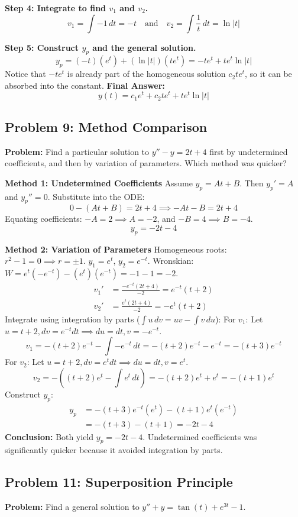 \documentclass{article}
\begin{document}
\textbf{Step 4: Integrate to find $v_1$ and $v_2$.}
\[ v_1 = \int -1 \, dt = -t \quad \text{and} \quad v_2 = \int \frac{1}{t} \, dt = \ln|t| \]

\textbf{Step 5: Construct $y_p$ and the general solution.}
\[ y_p = (-t)(e^t) + (\ln|t|)(t e^t) = -t e^t + t e^t \ln|t| \]
Notice that $-t e^t$ is already part of the homogeneous solution $c_2 t e^t$, so it can be absorbed into the constant.
\textbf{Final Answer:}
\[ y(t) = c_1 e^t + c_2 t e^t + t e^t \ln|t| \]

\subsection{Problem 9: Method Comparison}
\textbf{Problem:} Find a particular solution to $y'' - y = 2t + 4$ first by undetermined coefficients, and then by variation of parameters. Which method was quicker?

\textbf{Method 1: Undetermined Coefficients}
Assume $y_p = At + B$. Then $y_p' = A$ and $y_p'' = 0$.
Substitute into the ODE:
\[ 0 - (At + B) = 2t + 4 \implies -At - B = 2t + 4 \]
Equating coefficients: $-A = 2 \implies A = -2$, and $-B = 4 \implies B = -4$.
\[ y_p = -2t - 4 \]

\textbf{Method 2: Variation of Parameters}
Homogeneous roots: $r^2 - 1 = 0 \implies r = \pm 1$. $y_1 = e^t$, $y_2 = e^{-t}$.
Wronskian: $W = e^t(-e^{-t}) - (e^t)(e^{-t}) = -1 - 1 = -2$.
\begin{align*}
v_1' &= \frac{-e^{-t}(2t+4)}{-2} = e^{-t}(t+2) \\
v_2' &= \frac{e^t(2t+4)}{-2} = -e^t(t+2)
\end{align*}
Integrate using integration by parts ($\int u \, dv = uv - \int v \, du$):
For $v_1$: Let $u = t+2, dv = e^{-t}dt \implies du = dt, v = -e^{-t}$.
\[ v_1 = -(t+2)e^{-t} - \int -e^{-t} \, dt = -(t+2)e^{-t} - e^{-t} = -(t+3)e^{-t} \]
For $v_2$: Let $u = t+2, dv = e^tdt \implies du = dt, v = e^t$.
\[ v_2 = -\left( (t+2)e^t - \int e^t \, dt \right) = -(t+2)e^t + e^t = -(t+1)e^t \]
Construct $y_p$:
\begin{align*}
y_p &= -(t+3)e^{-t}(e^t) - (t+1)e^t(e^{-t}) \\
&= -(t+3) - (t+1) = -2t - 4
\end{align*}
\textbf{Conclusion:} Both yield $y_p = -2t - 4$. Undetermined coefficients was significantly quicker because it avoided integration by parts.

\subsection{Problem 11: Superposition Principle}
\textbf{Problem:} Find a general solution to $y'' + y = \tan(t) + e^{3t} - 1$.
\end{document}

